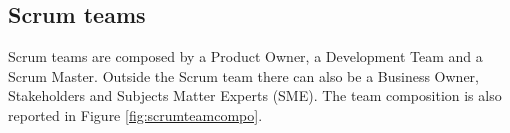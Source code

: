 \documentclass[../main.tex]{subfiles}
\begin{document}
\subsection{Scrum teams}
Scrum teams are composed by a Product Owner, a Development Team and a Scrum Master. Outside the Scrum team there can also be a Business Owner, Stakeholders and Subjects Matter Experts (SME). The team composition is also reported in Figure \ref{fig:scrumteamcompo}.
\begin{figure}[H]
    \centering
{} %

\begin{tikzpicture}[x=0.75pt,y=0.75pt,yscale=-1,xscale=1]


\end{tikzpicture}
\end{figure}
\end{document}
